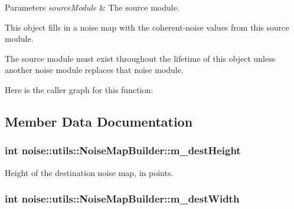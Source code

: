 \begin{DoxyParams}{Parameters}
{\em source\+Module} & The source module.\\
\hline
\end{DoxyParams}
This object fills in a noise map with the coherent-\/noise values from this source module.

The source module must exist throughout the lifetime of this object unless another noise module replaces that noise module. 

Here is the caller graph for this function\+:




\subsection{Member Data Documentation}
\hypertarget{classnoise_1_1utils_1_1_noise_map_builder_a06a6db4772fe959e741be9ebe2023ce8}{
\subsubsection[{m\+\_\+dest\+Height}]{\setlength{\rightskip}{0pt plus 5cm}int noise\+::utils\+::\+Noise\+Map\+Builder\+::m\+\_\+dest\+Height\hspace{0.3cm}{\ttfamily [protected]}}}\label{classnoise_1_1utils_1_1_noise_map_builder_a06a6db4772fe959e741be9ebe2023ce8}


Height of the destination noise map, in points. 

\hypertarget{classnoise_1_1utils_1_1_noise_map_builder_a95d8075e9917c2a1c319a0afe639dd31}{
\subsubsection[{m\+\_\+dest\+Width}]{\setlength{\rightskip}{0pt plus 5cm}int noise\+::utils\+::\+Noise\+Map\+Builder\+::m\+\_\+dest\+Width\hspace{0.3cm}{\ttfamily [protected]}}}\label{classnoise_1_1utils_1_1_noise_map_builder_a95d8075e9917c2a1c319a0afe639dd31}


